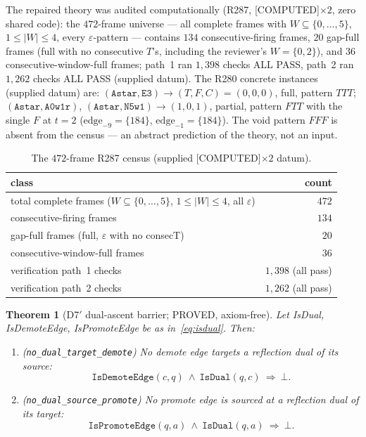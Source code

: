 \documentclass[11pt,a4paper]{article}
\newtheorem{theorem}{Theorem}
\theoremstyle{definition}
\begin{document}
The repaired theory was audited computationally (R287, [COMPUTED]$\times2$,
zero shared code): the $472$-frame universe --- all complete frames with
$W\subseteq\{0,\dots,5\}$, $1\le|W|\le4$, every $\varepsilon$-pattern ---
contains $134$ consecutive-firing frames, $20$ gap-full frames (full
with no consecutive $T$'s, including the reviewer's $W=\{0,2\}$), and
$36$ consecutive-window-full frames; path~1 ran $1{,}398$ checks ALL
PASS, path~2 ran $1{,}262$ checks ALL PASS (supplied datum). The R280
concrete instances (supplied datum) are: $(\mathtt{Astar,E3})\to
(T,F,C)=(0,0,0)$, full, pattern $TTT$; $(\mathtt{Astar,A0w1r})$,
$(\mathtt{Astar,N5w1})\to(1,0,1)$, partial, pattern $FTT$ with the
single $F$ at $t=2$ ($\mathrm{edge}_{-9}=\{184\}$,
$\mathrm{edge}_{-1}=\{184\}$). The void pattern $FFF$ is absent from the
census --- an abstract prediction of the theory, not an input.

\begin{table}[t]
  \centering
  \caption{The $472$-frame R287 census (supplied [COMPUTED]$\times2$
    datum).}
  \label{tab:lockcensus}
  \begin{tabular}{lr}
    \toprule
    class & count \\
    \midrule
    total complete frames ($W\subseteq\{0,\dots,5\}$,
      $1\le|W|\le4$, all $\varepsilon$) & $472$ \\
    consecutive-firing frames & $134$ \\
    gap-full frames (full, $\varepsilon$ with no consecT) & $20$ \\
    consecutive-window-full frames & $36$ \\
    verification path~1 checks & $1{,}398$ (all pass) \\
    verification path~2 checks & $1{,}262$ (all pass) \\
    \bottomrule
  \end{tabular}
\end{table}

\begin{theorem}[D7$'$ dual-ascent barrier; PROVED, axiom-free]
  \label{thm:d7p}
  Let IsDual, IsDemoteEdge, IsPromoteEdge be as
  in~\eqref{eq:isdual}. Then:
  \begin{enumerate}
  \item[(a)] (\texttt{no\_dual\_target\_demote}) No demote edge targets
    a reflection dual of its source:
    \begin{equation}
      \label{eq:d7pa}
      \mathtt{IsDemoteEdge}(c,q)\ \land\ \mathtt{IsDual}(q,c)
      \ \Longrightarrow\ \bot.
    \end{equation}
  \item[(b)] (\texttt{no\_dual\_source\_promote}) No promote edge is
    sourced at a reflection dual of its target:
    \begin{equation}
      \label{eq:d7pb}
      \mathtt{IsPromoteEdge}(q,a)\ \land\ \mathtt{IsDual}(q,a)
      \ \Longrightarrow\ \bot.
    \end{equation}
  \end{enumerate}
\end{theorem}
\end{document}
